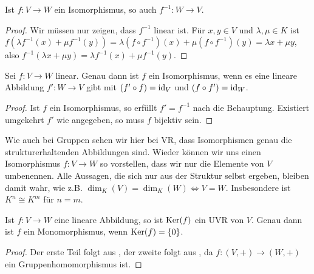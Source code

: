 \begin{lemma}
	Ist $f:V\to W$ ein Isomorphismus, so auch $f^{-1}:W\to V$.
\end{lemma}
\begin{proof}
	Wir müssen nur zeigen, dass $f^{-1}$ linear ist. Für $x,y\in V$ und $\lambda,\mu\in K$ ist $f(\lambda f^{-1}(x) + 
	\mu f^{-1}(y))=\lambda (f\circ f^{-1})(x) + \mu (f\circ f^{-1})(y)=\lambda x + \mu y$, also $f^{-1}(\lambda x + 
	\mu y)=\lambda f^{-1}(x) + \mu f^{-1}(y)$.
\end{proof}

\begin{proposition}
	Sei $f:V\to W$ linear. Genau dann ist $f$ ein Isomorphismus, wenn es eine lineare Abbildung $f':W
	\to V$ gibt mit $(f'\circ f)=\operatorname{id}_V$ und $(f\circ f')=\operatorname{id}_W$.
\end{proposition}
\begin{proof}
	Ist $f$ ein Isomorphismus, so erfüllt $f'=f^{-1}$ nach  die Behauptung. Existiert umgekehrt $f'$ wie angegeben, so muss 
	$f$ bijektiv sein.
\end{proof}

\begin{remark}
	Wie auch bei Gruppen sehen wir hier bei VR, dass Isomorphismen genau die strukturerhaltenden 
	Abbildungen sind. Wieder können wir uns einen Isomorphismus $f:V\to W$ so vorstellen, dass wir nur die Elemente von 
	$V$ umbenennen. Alle Aussagen, die sich nur aus der Struktur selbst ergeben, bleiben damit wahr, wie z.B. $\dim_K(V)=
	\dim_K(W)\iff V=W$. Insbesondere ist $K^n \cong K^m$ für $n=m$.
\end{remark}

\begin{proposition}
	Ist $f:V\to W$ eine lineare Abbildung, so ist $\operatorname{Ker}(f)$ ein UVR von $V$. Genau dann ist $f$ ein 
	Monomorphismus, wenn $\operatorname{Ker}(f)=\{0\}$.
\end{proposition}
\begin{proof}
	Der erste Teil folgt aus , der zweite folgt aus , da $f:(V,+)\to (W,+)$ ein 
	Gruppenhomomorphismus ist.
\end{proof}